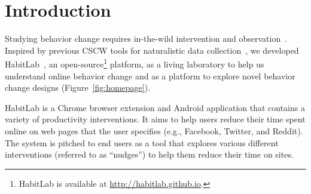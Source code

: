 \section{Introduction}

Studying behavior change requires in-the-wild intervention and observation~\cite{consolvo2008activity}. Inspired by previous CSCW tools for naturalistic data collection~\cite{reinecke2015labinthewild}, we developed HabitLab~\cite{habitlab}, an open-source\footnote{HabitLab is available at \url{http://habitlab.github.io}.} platform, as a living laboratory to help us understand online behavior change and as a platform to explore novel behavior change designs (Figure~\ref{fig:homepage}).


HabitLab is a Chrome browser extension and Android application that contains a variety of productivity interventions. It aims to help users reduce their time spent online on web pages that the user specifies (e.g., Facebook, Twitter, and Reddit). The system is pitched to end users as a tool that explores various different interventions (referred to as ``nudges'') to help them reduce their time on sites.


